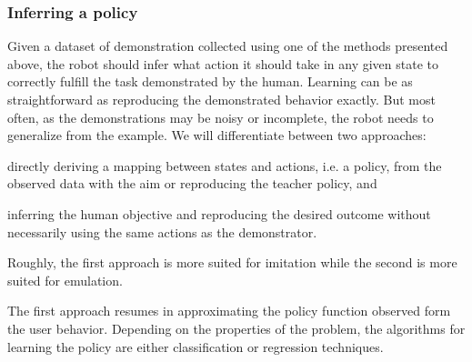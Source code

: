 \subsubsection*{Inferring a policy}

Given a dataset of demonstration collected using one of the methods presented above, the robot should infer what action it should take in any given state to correctly fulfill the task demonstrated by the human. Learning can be as straightforward as reproducing the demonstrated behavior exactly. But most often, as the demonstrations may be noisy or incomplete, the robot needs to generalize from the example. We will differentiate between two approaches: \begin{inparaenum}[(a)] \item directly deriving a mapping between states and actions, i.e. a policy, from the observed data with the aim or reproducing the teacher policy, and \item inferring the human objective and reproducing the desired outcome without necessarily using the same actions as the demonstrator. \end{inparaenum} Roughly, the first approach is more suited for imitation while the second is more suited for emulation. 

The first approach resumes in approximating the policy function observed form the user behavior. Depending on the properties of the problem, the algorithms for learning the policy are either classification or regression techniques. 

